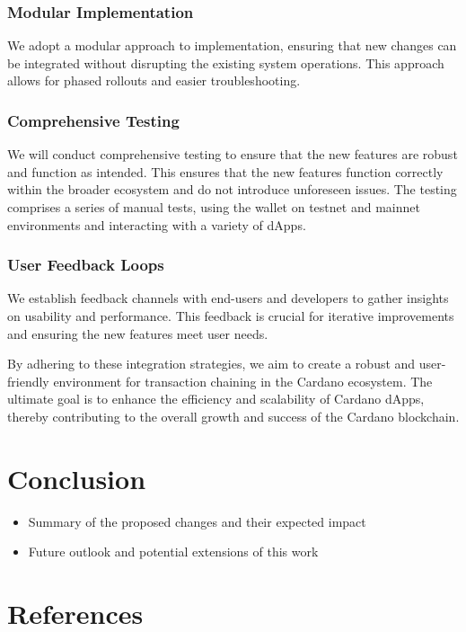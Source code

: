 \documentclass[11pt]{article}
\begin{document}
\subsubsection{Modular Implementation} 
We adopt a modular approach to implementation, ensuring that new changes can be integrated without disrupting the existing system operations.
This approach allows for phased rollouts and easier troubleshooting.

\subsubsection{Comprehensive Testing}
We will conduct comprehensive testing to ensure that the new features are robust and function as intended.
This ensures that the new features function correctly within the broader ecosystem and do not introduce unforeseen issues.
The testing comprises a series of manual tests, using the wallet on testnet and mainnet environments and interacting with a variety of dApps.

\subsubsection{User Feedback Loops}
We establish feedback channels with end-users and developers to gather insights on usability and performance.
This feedback is crucial for iterative improvements and ensuring the new features meet user needs.

By adhering to these integration strategies, we aim to create a robust and user-friendly environment for transaction chaining in the Cardano ecosystem. The ultimate goal is to enhance the efficiency and scalability of Cardano dApps, thereby contributing to the overall growth and success of the Cardano blockchain.


\section{Conclusion}
\begin{itemize}
    \item Summary of the proposed changes and their expected impact
    \item Future outlook and potential extensions of this work
\end{itemize}

\section{References}

\printbibliography
\end{document}
